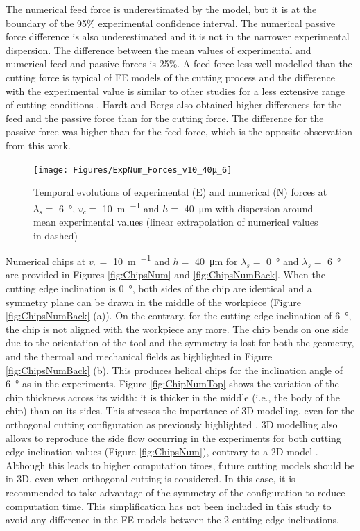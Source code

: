 \documentclass[preprint,12pt,times]{elsarticle}
\begin{document}
The numerical feed force is underestimated by the model, but it is at the boundary of the 95\% experimental confidence interval. The numerical passive force difference is also underestimated and it is not in the narrower experimental dispersion. The difference between the mean values of experimental and numerical feed and passive forces is 25\%. A feed force less well modelled than the cutting force is typical of FE models of the cutting process and the difference with the experimental value is similar to other studies for a less extensive range of cutting conditions \cite{sima_Modified_2010, ducobu_Material_2016, karpat_Temperature_2011, zhang_Chip_2011,afrasiabi_NumericalExperimental_2021}. Hardt and Bergs \cite{hardt_Three_2021} also obtained higher differences for the feed and the passive force than for the cutting force. The difference for the passive force was higher than for the feed force, which is the opposite observation from this work.

\begin{figure}[!h]
\centering
\texttt{[image: Figures/ExpNum\_Forces\_v10\_40µ\_6]}
\caption{Temporal evolutions of experimental (E) and numerical (N) forces at $\lambda_s =$ \qty{6}{\degree}, $v_c =$ \qty{10}{\m\per\min} and $h =$ \qty{40}{\um} with dispersion around mean experimental values (linear extrapolation of numerical values in dashed)}
\label{fig:ExpNum_Forces_v10_40µ_6}
\end{figure}

Numerical chips at $v_c =$ \qty{10}{\m\per\min} and $h =$ \qty{40}{\um} for $\lambda_s =$ \qty{0}{\degree} and $\lambda_s =$ \qty{6}{\degree} are provided in Figures \ref{fig:ChipsNum} and \ref{fig:ChipsNumBack}. When the cutting edge inclination is \qty{0}{\degree}, both sides of the chip are identical and a symmetry plane can be drawn in the middle of the workpiece (Figure \ref{fig:ChipsNumBack} (a)). On the contrary, for the cutting edge inclination of \qty{6}{\degree}, the chip is not aligned with the workpiece any more. The chip bends on one side due to the orientation of the tool and the symmetry is lost for both the geometry, and the thermal and mechanical fields as highlighted in Figure \ref{fig:ChipsNumBack} (b). This produces helical chips for the inclination angle of \qty{6}{\degree} as in the experiments. Figure \ref{fig:ChipNumTop} shows the variation of the chip thickness across its width: it is thicker in the middle (i.e., the body of the chip) than on its sides. This stresses the importance of 3D modelling, even for the orthogonal cutting configuration as previously highlighted \cite{ducobu_Finite_2017}. 3D modelling also allows to reproduce the side flow occurring in the experiments for both cutting edge inclination values (Figure \ref{fig:ChipsNum}), contrary to a 2D model \cite{xu_Simulation_2021, ambrosio_New_2022, ducobu_Finite_2017}. Although this leads to higher computation times, future cutting models should be in 3D, even when orthogonal cutting is considered. In this case, it is recommended to take advantage of the symmetry of the configuration to reduce computation time. This simplification has not been included in this study to avoid any difference in the FE models between the 2 cutting edge inclinations.
\end{document}
